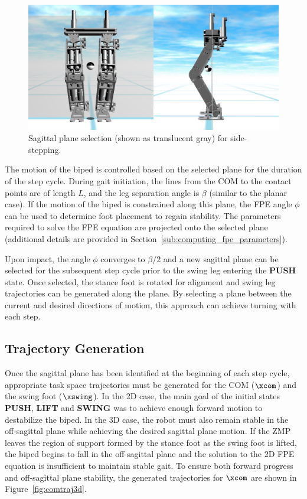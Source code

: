 \begin{figure}[!t]
	\centering
    \includegraphics[scale=0.4]{fig/fpe/fpeplanesidestep.png} 
  	\caption{Sagittal plane selection (shown as translucent gray) for side-stepping.}
	\label{fig:sideplane}
\end{figure}

The motion of the biped is controlled based on the selected plane for the duration of the step cycle. During gait initiation, the lines from the COM to the contact points are of length $L$, and the leg separation angle is $\beta$ (similar to the planar case). If the motion of the biped is constrained along this plane, the FPE angle $\phi$ can be used to determine foot placement to regain stability. The parameters required to solve the FPE equation are projected onto the selected plane (additional details are provided in Section~\ref{sub:computing_fpe_parameters}).

Upon impact, the angle $\phi$ converges to $\beta/2$ and a new sagittal plane can be selected for the subsequent step cycle prior to the swing leg entering the \textbf{PUSH} state. Once selected, the stance foot is rotated for alignment and swing leg trajectories can be generated along the plane. By selecting a plane between the current and desired directions of motion, this approach can achieve turning with each step.


\subsection{Trajectory Generation} %
\label{sub:trajectory_generation}
Once the sagittal plane has been identified at the beginning of each step cycle, appropriate task space trajectories must be generated for the COM ($\xcom$) and the swing foot ($\xswing$). In the 2D case, the main goal of the initial states \textbf{PUSH}, \textbf{LIFT} and \textbf{SWING} was to achieve enough forward motion to destabilize the biped. In the 3D case, the robot must also remain stable in the off-sagittal plane while achieving the desired sagittal plane motion. If the ZMP leaves the region of support formed by the stance foot as the swing foot is lifted, the biped begins to fall in the off-sagittal plane and the solution to the 2D FPE equation is insufficient to maintain stable gait. To ensure both forward progress and off-sagittal plane stability, the generated trajectories for $\xcom$ are shown in Figure~\ref{fig:comtraj3d}. \\


